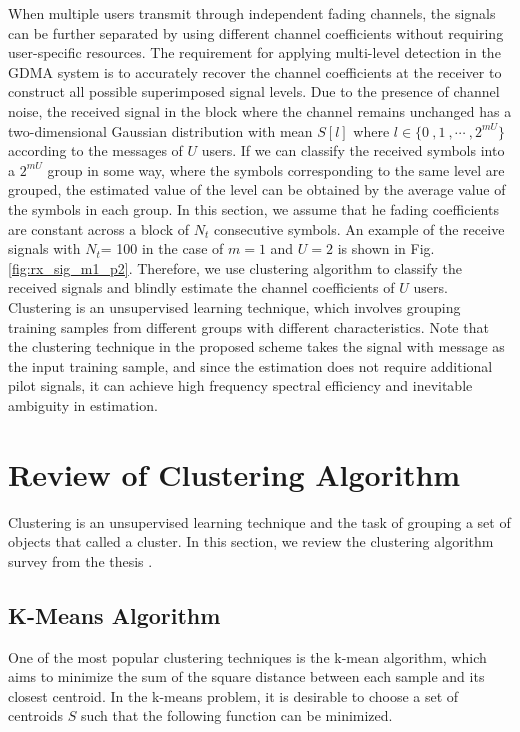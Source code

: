 When multiple users transmit through independent fading channels, the signals can be further separated by using different channel coefficients without requiring user-specific resources. The requirement for applying multi-level detection in the GDMA system is to accurately recover the channel coefficients at the receiver to construct all possible superimposed signal levels. Due to the presence of channel noise, the received signal in the block where the channel remains unchanged has a two-dimensional Gaussian distribution with mean $S[l]$ where $l \in \{0 \ ,1 \ , \cdots \ , 2^{mU} \}$ according to the messages of $U$ users. If we can classify the received symbols into a $2 ^ {mU} $ group in some way, where the symbols corresponding to the same level are grouped, the estimated value of the level can be obtained by the average value of the symbols in each group. In this section, we assume that he fading coefficients are constant across a block of $N_t$ consecutive symbols.  An example of the receive signals with $N_t$= 100 in the case of $m=1$ and $U=2$ is shown in Fig.\ref{fig:rx_sig_m1_p2}. Therefore, we use clustering algorithm to classify the received signals and blindly estimate the channel coefficients of $U$ users. Clustering is an unsupervised learning technique, which involves grouping training samples from different groups with different characteristics. Note that the clustering technique in the proposed scheme takes the signal with message as the input training sample, and since the estimation does not require additional pilot signals, it can achieve high frequency spectral efficiency and inevitable ambiguity in estimation.


\section{Review of Clustering Algorithm}

 Clustering is an unsupervised learning technique and the task of grouping a set of objects that called a cluster. In this section, we review the clustering algorithm survey from the thesis \cite{yt19}.

\subsection{K-Means Algorithm}
\label{s:clustering}

One of the most popular clustering techniques is the k-mean algorithm\cite {lloyd82}, which aims to minimize the sum of the square distance between each sample and its closest centroid. In the k-means problem, it is desirable to choose a set of centroids $S$ such that the following function can be minimized.

